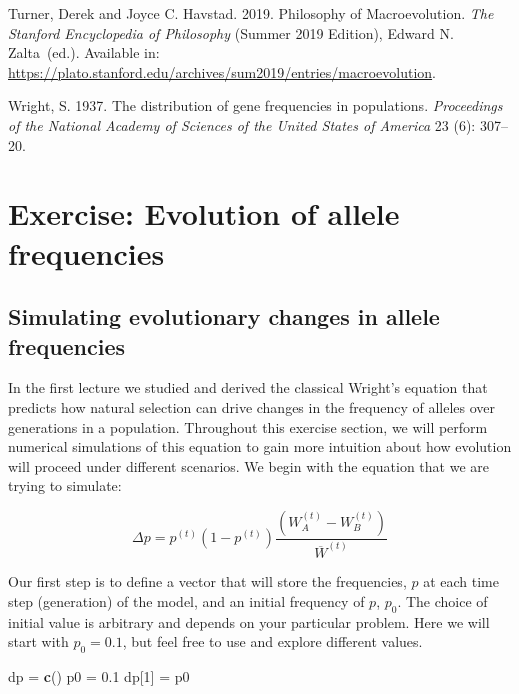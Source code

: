 \documentclass[
]{book}
\newenvironment{Shaded}{\begin{snugshade}}{\end{snugshade}}
\newcommand{\DecValTok}[1]{\textcolor[rgb]{0.00,0.00,0.81}{#1}}
\newcommand{\FloatTok}[1]{\textcolor[rgb]{0.00,0.00,0.81}{#1}}
\newcommand{\FunctionTok}[1]{\textcolor[rgb]{0.13,0.29,0.53}{\textbf{#1}}}
\newcommand{\NormalTok}[1]{#1}
\newcommand{\OtherTok}[1]{\textcolor[rgb]{0.56,0.35,0.01}{#1}}
\begin{document}
Turner, Derek and Joyce C. Havstad. 2019. Philosophy of Macroevolution. \emph{The Stanford Encyclopedia of Philosophy} (Summer 2019 Edition), Edward N. Zalta~(ed.). Available in: \url{https://plato.stanford.edu/archives/sum2019/entries/macroevolution}.

Wright, S. 1937. The distribution of gene frequencies in populations. \emph{Proceedings of the National Academy of Sciences of the United States of America} 23 (6): 307--20.

\hypertarget{exercise-evolution-of-allele-frequencies}{%
\chapter{Exercise: Evolution of allele frequencies}\label{exercise-evolution-of-allele-frequencies}}

\hypertarget{simulating-evolutionary-changes-in-allele-frequencies}{%
\section{Simulating evolutionary changes in allele frequencies}\label{simulating-evolutionary-changes-in-allele-frequencies}}

In the first lecture we studied and derived the classical Wright's equation that predicts how natural selection can drive changes in the frequency of alleles over generations in a population. Throughout this exercise section, we will perform numerical simulations of this equation to gain more intuition about how evolution will proceed under different scenarios. We begin with the equation that we are trying to simulate:

\[
\Delta p=p^{(t)}(1-p^{(t)})\frac{\left(W_{A}^{(t)}-W_{B}^{(t)}\right)}{\overline{W}^{(t)}}
\]

Our first step is to define a vector that will store the frequencies, \(p\) at each time step (generation) of the model, and an initial frequency of \(p\), \(p_{0}\). The choice of initial value is arbitrary and depends on your particular problem. Here we will start with \(p_{0}=0.1\), but feel free to use and explore different values.

\begin{Shaded}
\begin{Highlighting}[]
\NormalTok{dp }\OtherTok{=} \FunctionTok{c}\NormalTok{()}
\NormalTok{p0 }\OtherTok{=} \FloatTok{0.1}
\NormalTok{dp[}\DecValTok{1}\NormalTok{] }\OtherTok{=}\NormalTok{ p0}
\end{Highlighting}
\end{Shaded}
\end{document}

